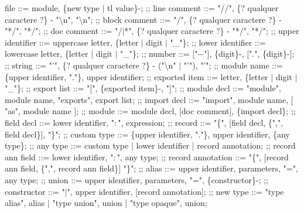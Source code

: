 \begin{bnfgrammar}
    file ::= module, \{new type $\vert$ tl value\}-;
    ;;
    line comment ::= "\slash\slash", \{? qualquer caractere ?\} - "\textbackslash n", "\textbackslash n";
    ;;
    block comment ::= "\slash*", \{? qualquer caractere ?\} - "*\slash", "*\slash";
    ;;
    doc comment ::= "\slash$\vert$*", \{? qualquer caractere ?\} - "*\slash", "*\slash";
    ;;
    upper identifier ::= uppercase letter, \{letter $\vert$ digit $\vert$ "\_"\};
    ;;
    lower identifier ::= lowercase letter, \{letter $\vert$ digit $\vert$ "\_"\};
    ;;
    number ::= ["$-$"], \{digit\}-, [".", \{digit\}-];
    ;;
    string ::= "'", \{? qualquer caractere ?\} - ("\textbackslash n" $\vert$ "'"), "'";
    ;;
    module name ::= \{upper identifier, "."\}, upper identifier;
    ;;
    exported item ::= letter, \{letter $\vert$ digit $\vert$ "\_"\};
    ;;
    export list ::= "[", \{exported item\}-, "]";
    ;;
    module decl ::= "module", module name, "exports", export list;
    ;;
    import decl ::= "import", module name, [ "as", module name ];
    ;;
    module ::= module decl, [doc comment], \{import decl\};
    ;;
    field decl ::= lower identifier, "$\colon$", expression;
    ;;
    record ::= "\{", [field decl, \{",", field decl\}], "\}";
    ;;
    custom type ::= \{upper identifier, "."\}, upper identifier, \{any type\};
    ;;
    any type ::= custom type
    | lower identifier
    | record annotation;
    ;;
    record ann field ::= lower identifier, "$\colon$", any type;
    ;;
    record annotation ::= "\{", [record ann field, \{",", record ann field\}] "\}";
    ;;
    alias ::= upper identifier, parameters, "=", any type;
    ;;
    union ::= upper identifier, parameters, "=", \{constructor\}-;
    ;;
    constructor ::= "$\vert$", upper identifier, [record annotation];
    ;;
    new type ::= "type alias", alias
    | "type union", union
    | "type opaque", union;
\end{bnfgrammar}
